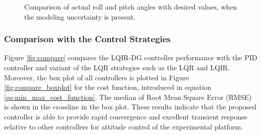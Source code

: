 \documentclass[3p]{elsarticle}
\begin{document}
\begin{figure}[H]
	\caption{Comparison of actual roll and pitch angles with desired values, when the modeling uncertainty is present.}
	\label{fig:weight}
\end{figure}
\subsubsection{Comparison with the Control Strategies}
\noindent Figure \ref{fig:compare} compares the LQIR-DG controller performance with the PID controller and variant of the LQR strategies such as the LQR and LQIR. 
Moreover, the box plot of all controllers is plotted in Figure \ref{fig:compare_boxplot} for the cost function, introduced in equation \eqref{eq:min_max_cost_function}. %
The median of Root Mean Square Error (RMSE) is shown in the crossline in the box plot.
These results indicate that the proposed controller is able to provide rapid convergence and excellent transient response relative to other controllers for attitude control of the experimental platform.
\end{document}
